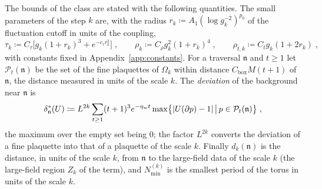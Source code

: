 \documentclass[11pt]{preprint}
\DeclarePairedDelimiter{\abs}{\lvert}{\rvert}
\numberwithin{equation}{section}
\theoremstyle{definition}
\theoremstyle{remark}
\theoremstyle{plain}
\begin{document}
The bounds of the class are stated with the following quantities. The small parameters of the step $k$ are, with the radius $r_k \coloneqq A_1(\log g_k^{-2})^{p_0}$ of the fluctuation cutoff in units of the coupling,
\begin{equation}\label{eq:class-parameters}
    \tau_k \coloneqq C_\tau\bigl[g_k(1 + r_k)^3 + e^{-c_\tau r_k^2}\bigr]\;,
    \qquad
    \rho_k \coloneqq C_\rho g_k^2(1 + r_k)^4\;,
    \qquad
    \rho_{t,k} \coloneqq C_tg_k(1 + 2r_k)\;,
\end{equation}
with constants fixed in Appendix~\ref{app:constants}. For a traversal $\mathfrak n$ and $t \geq 1$ let $\mathcal P_t(\mathfrak n)$ be the set of the fine plaquettes of $\Omega_k$ within distance $C_{\mathrm{box}}M(t + 1)$ of $\mathfrak n$, the distance measured in units of the scale $k$. The \emph{deviation} of the background near $\mathfrak n$ is
\begin{equation}\label{eq:deviation-quantity}
    \delta^{*}_{\mathfrak n}(U) \coloneqq L^{2k}\sum_{t \geq 1}(t + 1)^3e^{-\eta_wt}\max\bigl\{ \abs{U(\partial p) - 1} \,\big|\, p \in \mathcal P_t(\mathfrak n) \bigr\}\;,
\end{equation}
the maximum over the empty set being $0$; the factor $L^{2k}$ converts the deviation of a fine plaquette into that of a plaquette of the scale $k$. Finally $d_k(\mathfrak n)$ is the distance, in units of the scale $k$, from $\mathfrak n$ to the large-field data of the scale $k$ (the large-field region $Z_k$ of the term), and $N^{(k)}_{\min}$ is the smallest period of the torus in units of the scale $k$.
\end{document}

